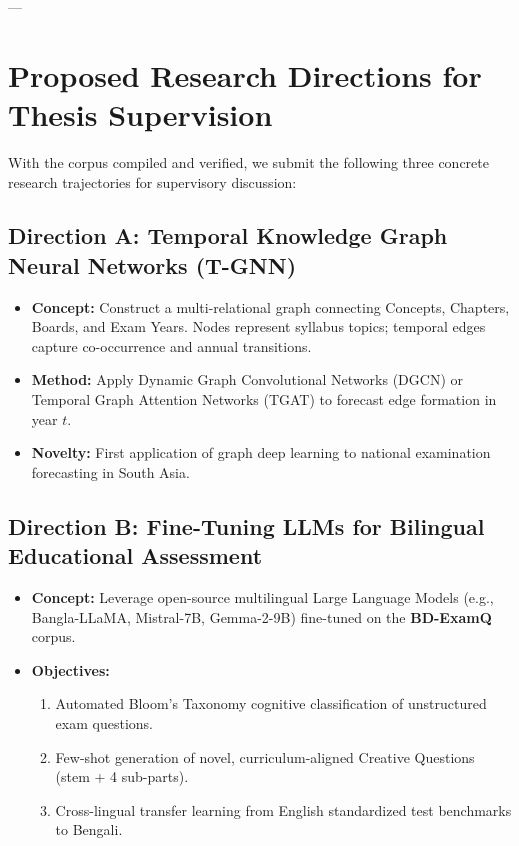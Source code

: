 \documentclass[11pt,a4paper]{article}
\begin{document}
---

\section{Proposed Research Directions for Thesis Supervision}
\label{sec:thesis_directions}

With the corpus compiled and verified, we submit the following three concrete research trajectories for supervisory discussion:

\subsection{Direction A: Temporal Knowledge Graph Neural Networks (T-GNN)}
\begin{itemize}[noitemsep,topsep=2pt]
    \item \textbf{Concept:} Construct a multi-relational graph connecting Concepts, Chapters, Boards, and Exam Years. Nodes represent syllabus topics; temporal edges capture co-occurrence and annual transitions.
    \item \textbf{Method:} Apply Dynamic Graph Convolutional Networks (DGCN) or Temporal Graph Attention Networks (TGAT) \cite{xu2020tgat, sankar2020dysat} to forecast edge formation in year $t$.
    \item \textbf{Novelty:} First application of graph deep learning to national examination forecasting in South Asia.
\end{itemize}

\subsection{Direction B: Fine-Tuning LLMs for Bilingual Educational Assessment}
\begin{itemize}[noitemsep,topsep=2pt]
    \item \textbf{Concept:} Leverage open-source multilingual Large Language Models \cite{radford2019language, scao2021bloom, hasan2020lowresource} (e.g., Bangla-LLaMA, Mistral-7B, Gemma-2-9B) fine-tuned on the \textbf{BD-ExamQ} corpus.
    \item \textbf{Objectives:} 
    \begin{enumerate}[noitemsep]
        \item Automated Bloom's Taxonomy cognitive classification of unstructured exam questions.
        \item Few-shot generation of novel, curriculum-aligned Creative Questions (stem + 4 sub-parts).
        \item Cross-lingual transfer learning from English standardized test benchmarks to Bengali.
    \end{enumerate}
\end{itemize}
\end{document}
